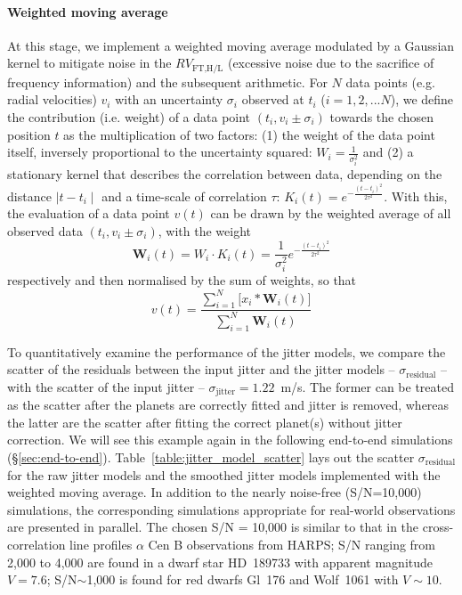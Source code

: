 \paragraph{Weighted moving average} At this stage, we implement a weighted moving average modulated by a Gaussian kernel to mitigate noise in the $RV_\text{FT,H/L}$ (excessive noise due to the sacrifice of frequency information) and the subsequent arithmetic. For $N$ data points (e.g. radial velocities) $v_i$ with an uncertainty $\sigma_i$ observed at $t_i$ ($i=1,2,...N$), we define the contribution (i.e. weight) of a data point $(t_i, v_i\pm \sigma_i)$ towards the chosen position $t$ as the multiplication of two factors: (1) the weight of the data point itself, inversely proportional to the uncertainty squared: $W_i= \frac{1}{\sigma_i^2}$ and (2) a stationary kernel that describes the correlation between data, depending on the distance $\mid t-t_i \mid$ and a time-scale of correlation $\tau$: $K_i(t) = e^{-\frac{(t-t_i)^2}{2\tau^2}}$. With this, the evaluation of a data point $v(t)$ can be drawn by the weighted average of all observed data $(t_i, v_i\pm \sigma_i)$, with the weight 
\begin{equation}
	\textbf{W}_i(t) = W_i \cdot K_i(t) = \frac{1}{\sigma_i^2} e^{-\frac{(t-t_i)^2}{2\tau^2}}
\end{equation}
respectively and then normalised by the sum of weights, so that 
\begin{equation}
	v(t) 	=  \frac{\sum\limits_{i=1}^{N} \bigg[x_i*\textbf{W}_i(t)\bigg]}{\sum\limits_{i=1}^{N} \textbf{W}_i(t)}
\end{equation}

To quantitatively examine the performance of the jitter models, we compare the scatter of the residuals between the input jitter and the jitter models -- $\sigma_\text{residual}$ -- with the scatter of the input jitter -- $\sigma_\text{jitter} = 1.22$~m/s. The former can be treated as the scatter after the planets are correctly fitted and jitter is removed, whereas the latter are the scatter after fitting the correct planet(s) without jitter correction. We will see this example again in the following end-to-end simulations (\S\ref{sec:end-to-end}). Table~\ref{table:jitter_model_scatter} lays out the scatter $\sigma_\text{residual}$ for the raw jitter models and the smoothed jitter models implemented with the weighted moving average. In addition to the nearly noise-free (S/N=10,000) simulations, the corresponding simulations appropriate for real-world observations are presented in parallel. The chosen S/N = 10,000 is similar to that in the cross-correlation line profiles $\alpha$ Cen B observations from HARPS; S/N ranging from 2,000 to 4,000 are found in a dwarf star HD~189733 with apparent magnitude $V=7.6$; S/N$\sim$1,000 is found for red dwarfs Gl~176 and Wolf~1061 with $V\sim10$. 

